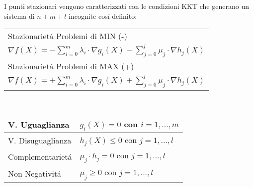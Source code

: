 \documentclass[12pt, a4paper, openany]{book}
\begin{document}
I punti stazionari vengono caratterizzati con le condizioni KKT che generano un sistema di $n+m+l$ incognite cosí definito:\\
\begin{tabularx}{\textwidth}{|Y|}
    \hline
    Stazionarietá Problemi di MIN (-)\\
        $ \nabla f(X) = - \sum_{i=0}^{m} \lambda_i \cdot \nabla g_i(X) - \sum_{j=0}^{l} \mu_j \cdot \nabla h_j(X)$ \\
    \hline \hline
    Stazionarietá Problemi di MAX (+)\\
    $ \nabla f(X) = + \sum_{i=0}^{m} \lambda_i \cdot \nabla g_i(X) + \sum_{j=0}^{l} \mu_j \cdot \nabla h_j(X)$ \\
    \hline
\end{tabularx}\\
\begin{tabularx}{\textwidth}{|l|Y|}
    \hline
    V. Uguaglianza & $g_i(X) = 0$ con $i=1,...,m$ \\
    \hline
    V. Disuguaglianza & $h_j(X) \leq 0$ con $j=1,...,l$ \\
    \hline
    Complementarietá & $\mu_j \cdot h_j = 0$ con $j=1,...,l$ \\ 
    \hline
    Non Negativitá & $\mu_j \geq 0$  con $j=1,...,l$ \\
    \hline   
\end{tabularx}
\end{document}

